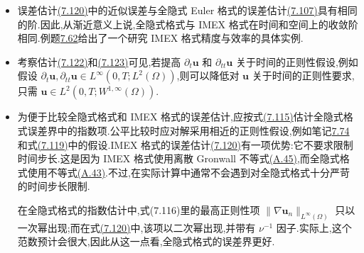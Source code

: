 \begin{note}[关于误差估计(7.120)]\label{note:imex-euler-error-estimate}
\begin{itemize}
  \item 误差估计\hyperref[eq:imex-euler-velocity-error]{(7.120)}中的近似误差与全隐式 Euler 格式的误差估计\hyperref[eq:fully-discrete-backward-euler-velocity-error]{(7.107)}具有相同的阶.因此,从渐近意义上说,全隐式格式与 IMEX 格式在时间和空间上的收敛阶相同.例题\hyperref[ex:imex-schemes-cylinder]{7.62}给出了一个研究 IMEX 格式精度与效率的具体实例.
  \item 考察估计\hyperref[eq:imex-euler-error-temporal-spatial-product]{(7.122)}和\hyperref[eq:imex-euler-error-second-time-derivative-bound]{(7.123)}可见,若提高 $\partial_t\bm{u}$ 和 $\partial_{tt}\bm{u}$ 关于时间的正则性假设,例如假设 $\partial_t\bm{u},\partial_{tt}\bm{u}\in L^\infty(0,T;L^2(\Omega))$,则可以降低对 $\bm{u}$ 关于时间的正则性要求,只需 $\bm{u}\in L^2(0,T;W^{1,\infty}(\Omega))$.
  \item 为便于比较全隐式格式和 IMEX 格式的误差估计,应按式\hyperref[eq:backward-euler-exponential-limit]{(7.115)}估计全隐式格式误差界中的指数项.公平比较时应对解采用相近的正则性假设,例如笔记\hyperref[note:fully-discrete-backward-euler-higher-regularity]{7.74}和式\hyperref[eq:imex-euler-error-regularity]{(7.119)}中的假设.IMEX 格式的误差估计\hyperref[eq:imex-euler-velocity-error]{(7.120)}有一项优势:它不要求限制时间步长.这是因为 IMEX 格式使用离散 Gronwall 不等式\hyperref[lem:appendix-a-45]{(A.45)},而全隐式格式使用不等式\hyperref[lem:appendix-a-43]{(A.43)}.不过,在实际计算中通常不会遇到对全隐式格式十分严苛的时间步长限制.

    在全隐式格式的指数估计中,式(7.116)里的最高正则性项 $\|\nabla\bm{u}_n\|_{L^\infty(\Omega)}$ 只以一次幂出现;而在式\hyperref[eq:imex-euler-velocity-error]{(7.120)}中,该项以二次幂出现,并带有 $\nu^{-1}$ 因子.实际上,这个范数预计会很大,因此从这一点看,全隐式格式的误差界更好.
\end{itemize}
\end{note}

